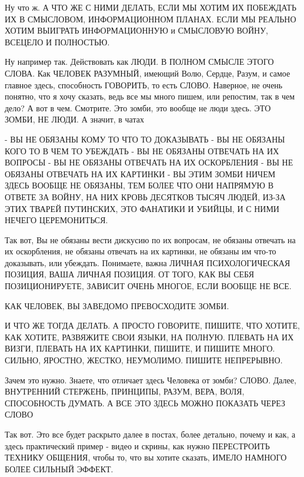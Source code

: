 Ну что ж. А ЧТО ЖЕ С НИМИ ДЕЛАТЬ, ЕСЛИ МЫ ХОТИМ ИХ ПОБЕЖДАТЬ ИХ В СМЫСЛОВОМ,
ИНФОРМАЦИОННОМ ПЛАНАХ. ЕСЛИ МЫ РЕАЛЬНО ХОТИМ ВЫИГРАТЬ ИНФОРМАЦИОННУЮ и
СМЫСЛОВУЮ ВОЙНУ, ВСЕЦЕЛО И ПОЛНОСТЬЮ.

Ну например так. Действовать как ЛЮДИ. В ПОЛНОМ СМЫСЛЕ ЭТОГО СЛОВА. Как ЧЕЛОВЕК
РАЗУМНЫЙ, имеющий Волю, Сердце, Разум, и самое главное здесь, способность
ГОВОРИТЬ, то есть СЛОВО. Наверное, не очень понятно, что я хочу сказать, ведь
все мы много пишем, или репостим, так в чем дело? А вот в чем. Смотрите. Это
зомби, это вообще не люди здесь. ЭТО ЗОМБИ, НЕ ЛЮДИ. А значит, в чатах

- ВЫ НЕ ОБЯЗАНЫ КОМУ ТО ЧТО ТО ДОКАЗЫВАТЬ
- ВЫ НЕ ОБЯЗАНЫ КОГО ТО В ЧЕМ ТО УБЕЖДАТЬ
- ВЫ НЕ ОБЯЗАНЫ ОТВЕЧАТЬ НА ИХ ВОПРОСЫ
- ВЫ НЕ ОБЯЗАНЫ ОТВЕЧАТЬ НА ИХ ОСКОРБЛЕНИЯ
- ВЫ НЕ ОБЯЗАНЫ ОТВЕЧАТЬ НА ИХ КАРТИНКИ
- ВЫ ЭТИМ ЗОМБИ НИЧЕМ ЗДЕСЬ ВООБЩЕ НЕ ОБЯЗАНЫ, ТЕМ БОЛЕЕ ЧТО ОНИ НАПРЯМУЮ В
ОТВЕТЕ ЗА ВОЙНУ, НА НИХ КРОВЬ ДЕСЯТКОВ ТЫСЯЧ ЛЮДЕЙ, ИЗ-ЗА ЭТИХ ТВАРЕЙ
ПУТИНСКИХ, ЭТО ФАНАТИКИ И УБИЙЦЫ, И С НИМИ НЕЧЕГО ЦЕРЕМОНИТЬСЯ.

Так вот, Вы не обязаны вести дискусию по их вопросам, не обязаны отвечать на их
оскорбления, не обязаны отвечать на их картинки, не обязаны им что-то
доказывать, или убеждать. Понимаете, важна ЛИЧНАЯ ПСИХОЛОГИЧЕСКАЯ ПОЗИЦИЯ, ВАША
ЛИЧНАЯ ПОЗИЦИЯ. ОТ ТОГО, КАК ВЫ СЕБЯ ПОЗИЦИОНИРУЕТЕ, ЗАВИСИТ ОЧЕНЬ МНОГОЕ, ЕСЛИ
ВООБЩЕ НЕ ВСЕ.

КАК ЧЕЛОВЕК, ВЫ ЗАВЕДОМО ПРЕВОСХОДИТЕ ЗОМБИ.

И ЧТО ЖЕ ТОГДА ДЕЛАТЬ. А ПРОСТО ГОВОРИТЕ, ПИШИТЕ, ЧТО ХОТИТЕ, КАК ХОТИТЕ,
РАЗВЯЖИТЕ СВОИ ЯЗЫКИ, НА ПОЛНУЮ. ПЛЕВАТЬ НА ИХ ВИЗГИ, ПЛЕВАТЬ НА ИХ КАРТИНКИ,
ПИШИТЕ, И ПИШИТЕ МНОГО. СИЛЬНО, ЯРОСТНО, ЖЕСТКО, НЕУМОЛИМО. ПИШИТЕ НЕПРЕРЫВНО.

Зачем это нужно. Знаете, что отличает здесь Человека от зомби? СЛОВО.  Далее,
ВНУТРЕННИЙ СТЕРЖЕНЬ, ПРИНЦИПЫ, РАЗУМ, ВЕРА, ВОЛЯ, СПОСОБНОСТЬ ДУМАТЬ. А ВСЕ ЭТО
ЗДЕСЬ МОЖНО ПОКАЗАТЬ ЧЕРЕЗ СЛОВО

Так вот. Это все будет раскрыто далее в постах, более детально, почему и как, а
здесь практический пример - видео и скрины, как нужно ПЕРЕСТРОИТЬ ТЕХНИКУ
ОБЩЕНИЯ, чтобы то, что вы хотите сказать, ИМЕЛО НАМНОГО БОЛЕЕ СИЛЬНЫЙ ЭФФЕКТ.

